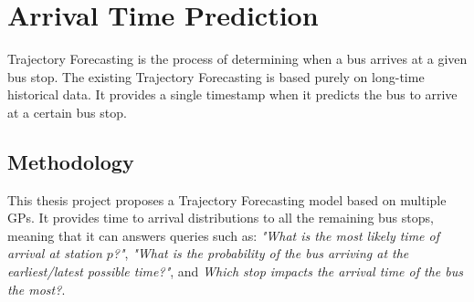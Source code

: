 \chapter{Arrival Time Prediction}
\label{cha:arrival-time-prediction}

Trajectory Forecasting is the process of determining when a bus arrives at a given bus stop.
The existing Trajectory Forecasting is based purely on long-time historical data.
It provides a single timestamp when it predicts the bus to arrive at a certain bus stop.


\section{Methodology}

This thesis project proposes a Trajectory Forecasting model based on multiple GPs.
It provides time to arrival distributions to all the remaining bus stops, meaning that it can answers queries such as:
\textit{"What is the most likely time of arrival at station $p$?"}, \textit{"What is the probability of the bus arriving at the earliest/latest possible time?"}, and \textit{Which stop impacts the arrival time of the bus the most?}.

